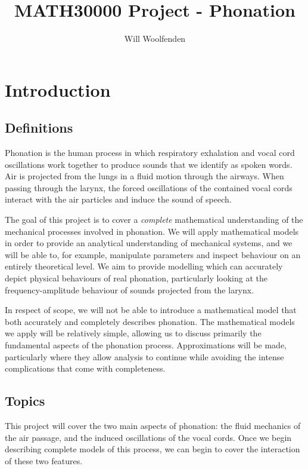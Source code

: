 \documentclass{article}
\title{MATH30000 Project - Phonation}
\author{Will Woolfenden}
\begin{document}
\maketitle

\section{Introduction}

\subsection{Definitions}

Phonation is the human process in which respiratory exhalation and vocal cord oscillations work together to produce sounds that we identify as spoken words.
Air is projected from the lungs in a fluid motion through the airways.
When passing through the larynx, the forced oscillations of the contained vocal cords interact with the air particles and induce the sound of speech.

The goal of this project is to cover a \textit{complete} mathematical understanding of the mechanical processes involved in phonation.
We will apply mathematical models in order to provide an analytical understanding of mechanical systems,
and we will be able to, for example, manipulate parameters and inspect behaviour on an entirely theoretical level.
We aim to provide modelling which can accurately depict physical behaviours of real phonation,
particularly looking at the frequency-amplitude behaviour of sounds projected from the larynx.

In respect of scope, we will not be able to introduce a mathematical model that both accurately and completely describes phonation.
The mathematical models we apply will be relatively simple, allowing us to discuss primarily the fundamental aspects of the phonation process.
Approximations will be made, particularly where they allow analysis to continue while avoiding the intense complications that come with completeness. %

\subsection{Topics}

This project will cover the two main aspects of phonation: the fluid mechanics of the air passage, and the induced oscillations of the vocal cords.
Once we begin describing complete models of this process, we can begin to cover the interaction of these two features.
\end{document}

